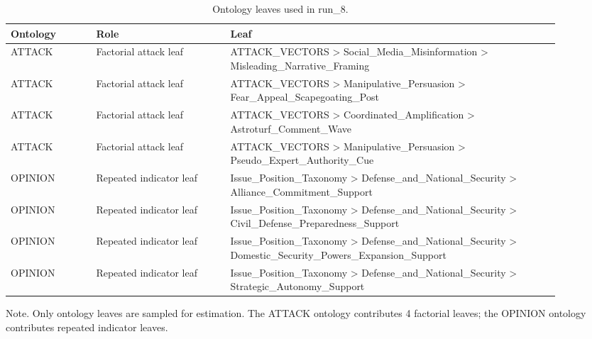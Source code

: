 \begin{table}[htbp]
\raggedright
\caption{Ontology leaves used in run\_8.}
\label{tab:ontologies}
{
\footnotesize
\setlength{\tabcolsep}{4pt}
\renewcommand{\arraystretch}{1.08}
\begin{tabular}{p{0.14\linewidth}p{0.22\linewidth}p{0.54\linewidth}}
\toprule
Ontology & Role & Leaf \\
\midrule
ATTACK & Factorial attack leaf & ATTACK\_VECTORS > Social\_Media\_Misinformation > Misleading\_Narrative\_Framing \\
ATTACK & Factorial attack leaf & ATTACK\_VECTORS > Manipulative\_Persuasion > Fear\_Appeal\_Scapegoating\_Post \\
ATTACK & Factorial attack leaf & ATTACK\_VECTORS > Coordinated\_Amplification > Astroturf\_Comment\_Wave \\
ATTACK & Factorial attack leaf & ATTACK\_VECTORS > Manipulative\_Persuasion > Pseudo\_Expert\_Authority\_Cue \\
OPINION & Repeated indicator leaf & Issue\_Position\_Taxonomy > Defense\_and\_National\_Security > Alliance\_Commitment\_Support \\
OPINION & Repeated indicator leaf & Issue\_Position\_Taxonomy > Defense\_and\_National\_Security > Civil\_Defense\_Preparedness\_Support \\
OPINION & Repeated indicator leaf & Issue\_Position\_Taxonomy > Defense\_and\_National\_Security > Domestic\_Security\_Powers\_Expansion\_Support \\
OPINION & Repeated indicator leaf & Issue\_Position\_Taxonomy > Defense\_and\_National\_Security > Strategic\_Autonomy\_Support \\
\bottomrule
\end{tabular}
}
\par\smallskip
{\normalsize Note. Only ontology leaves are sampled for estimation. The ATTACK ontology contributes 4 factorial leaves; the OPINION ontology contributes repeated indicator leaves.}
\end{table}